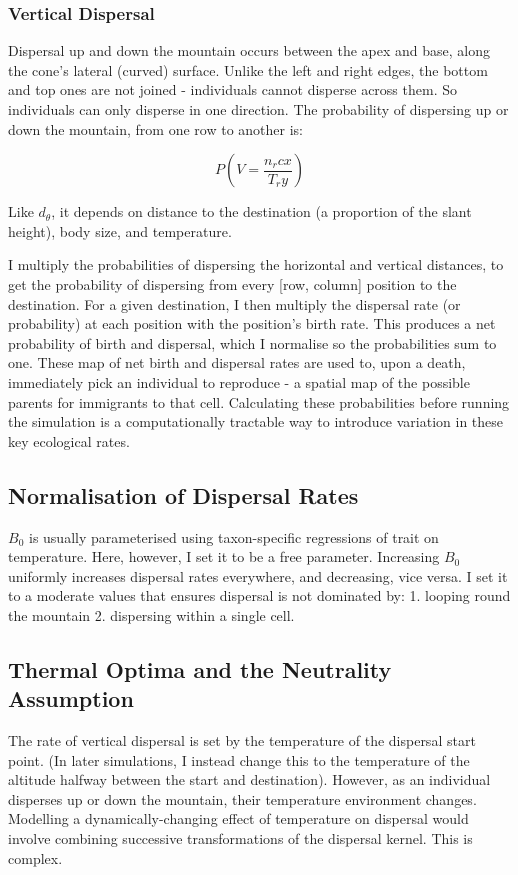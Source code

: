\documentclass[11pt]{article}
\begin{document}
\subsubsection*{Vertical Dispersal}
Dispersal up and down the mountain occurs between the apex and base, along the cone's lateral (curved) surface.
Unlike the left and right edges, the bottom and top ones are not joined - individuals cannot disperse across them. So individuals can only disperse in one direction. The probability of dispersing up or down the mountain, from one row to another is:

$$P(V = \frac{n_r cx}{T_r y})$$

Like $d_\theta$, it depends on distance to the destination (a proportion of the slant height), body size, and temperature.

I multiply the probabilities of dispersing the horizontal and vertical distances, to get the probability of dispersing from every [row, column] position to the destination. For a given destination, I then multiply the dispersal rate (or probability) at each position with the position's birth rate. This produces a net probability of birth and dispersal, which I normalise so the probabilities sum to one. These map of net birth and dispersal rates are used to, upon a death, immediately pick an individual to reproduce - a spatial map of the possible parents for immigrants to that cell. Calculating these probabilities before running the simulation is a computationally tractable way to introduce variation in these key ecological rates.

\subsection*{Normalisation of Dispersal Rates}
$B_0$ is usually parameterised using taxon-specific regressions of trait on temperature. Here, however, I set it to be a free parameter. Increasing $B_0$ uniformly increases dispersal rates everywhere, and decreasing, vice versa. I set it to a moderate values that ensures dispersal is not dominated by:
1. looping round the mountain
2. dispersing within a single cell.

\subsection*{Thermal Optima and the Neutrality Assumption}
The rate of vertical dispersal is set by the temperature of the dispersal start point. (In later simulations, I instead change this to the temperature of the altitude halfway between the start and destination). However, as an individual disperses up or down the mountain, their temperature environment changes. Modelling a dynamically-changing effect of temperature on dispersal would involve combining successive transformations of the dispersal kernel. This is complex. 
\end{document}
